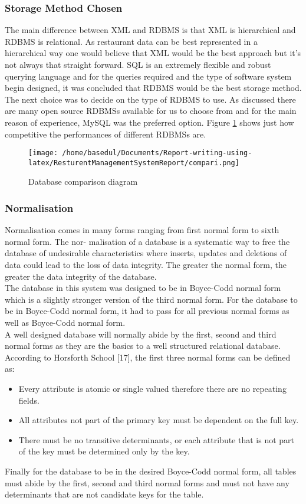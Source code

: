 \documentclass[12pt,a4paper]{article}
\begin{document}
\subsubsection{Storage Method Chosen}
	The main difference between XML and RDBMS is that XML is hierarchical and RDBMS is relational.
As restaurant data can be best represented in a hierarchical way one would believe that XML would be
the best approach but it’s not always that straight forward. SQL is an extremely flexible and robust querying language and for the queries required and the type of software system begin designed, it was
concluded that RDBMS would be the best storage method.
The next choice was to decide on the type of RDBMS to use. As discussed there are many open
source RDBMSs available for us to choose from and for the main reason of experience, MySQL was the
preferred option. Figure \ref{fig:compari} shows just how competitive the performances of different RDBMSs are.
\begin{figure}[H]
		\centering
		\texttt{[image: /home/basedul/Documents/Report-writing-using-latex/ResturentManagementSystemReport/compari.png]}
		\caption{Database comparison diagram \cite{Ref:6}}
		\label{fig:compari} 
	\end{figure}
\subsubsection{Normalisation}
Normalisation comes in many forms ranging from first normal form to sixth normal form. The nor-
malisation of a database is a systematic way to free the database of undesirable characteristics where
inserts, updates and deletions of data could lead to the loss of data integrity. The greater the normal
form, the greater the data integrity of the database.\\
The database in this system was designed to be in Boyce-Codd normal form which is a slightly
stronger version of the third normal form. For the database to be in Boyce-Codd normal form, it had
to pass for all previous normal forms as well as Boyce-Codd normal form.\\
A well designed database will normally abide by the first, second and third normal forms as they
are the basics to a well structured relational database. According to Horsforth School [17], the first
three normal forms can be defined as:
\begin{itemize}
	\item Every attribute is atomic or single valued therefore there are no repeating fields.
	\item All attributes not part of the primary key must be dependent on the full key.
	\item There must be no transitive determinants, or each attribute that is not part of
the key must be determined only by the key.
\end{itemize}
Finally for the database to be in the desired Boyce-Codd normal form, all tables must abide by the
first, second and third normal forms and must not have any determinants that are not candidate keys
for the table.
\end{document}
